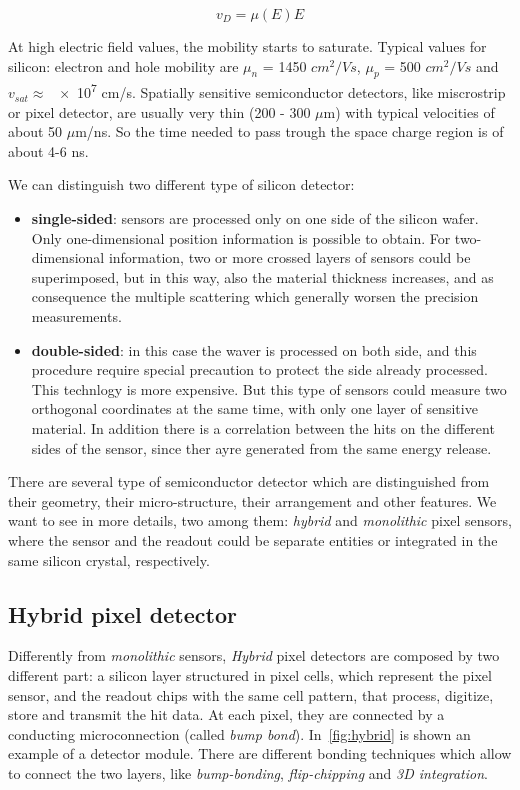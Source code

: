 \begin{equation}
v_{D} = \mu(E) E
\end{equation}

At high electric field values, the mobility starts to saturate.  Typical values for silicon: electron and hole mobility are $\mu_{n}$ = 1450 $cm^{2}/Vs$, $\mu_{p}$ = 500 $cm^{2}/Vs$ and $v_{sat}\approx$ \num{e7} cm/s.
Spatially sensitive semiconductor detectors, like miscrostrip or pixel detector, are usually very thin (200 - 300 $\mu$m) with typical velocities of about 50 $\mu$m/ns. So the time needed to pass trough the space charge region is of about 4-6 ns. 

We can distinguish two different type of silicon detector:

\begin{itemize}
\item \textbf{single-sided}: sensors are processed only on one side of the silicon wafer. Only one-dimensional position information is possible to obtain. For two-dimensional information, two or more crossed layers of sensors could be superimposed, but in this way, also the material thickness increases, and as consequence the multiple scattering which generally worsen the precision measurements. 
\item \textbf{double-sided}: in this case the waver is processed on both side, and this procedure require special precaution to protect the side already processed. This technlogy is more expensive. But this type of sensors could measure two orthogonal coordinates at the same time, with only one layer of sensitive material. In addition there is a correlation between the hits on the different sides of the sensor, since ther ayre generated from the same energy release.
\end{itemize}

There are several type of semiconductor detector which are distinguished from their geometry, their micro-structure, their arrangement and other features. We want to see in more details, two among them: \emph{hybrid} and \emph{monolithic} pixel sensors, where the sensor and the readout could be separate entities or integrated in the same silicon crystal, respectively.

\subsection{Hybrid pixel detector}

Differently from \textit{monolithic} sensors, \textit{Hybrid} pixel detectors are composed by two different part: a silicon layer structured in pixel cells, which represent the pixel sensor, and the readout chips with the same cell pattern, that process, digitize, store and transmit the hit data. At each pixel, they are connected by a conducting microconnection (called \emph{bump bond}). In~\autoref{fig:hybrid} is shown an example of a detector module. 
There are different bonding techniques which allow to connect the two layers, like \emph{bump-bonding}, \emph{flip-chipping} and \emph{3D integration}. 

